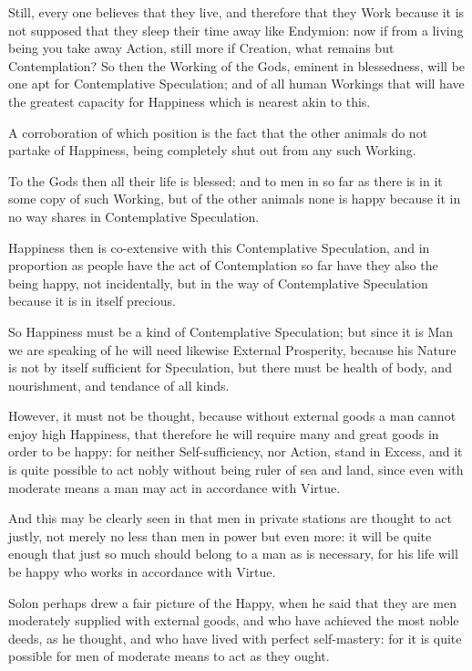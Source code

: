 Still, every one believes that they live, and therefore that they Work because
it is not supposed that they sleep their time away like Endymion: now if from a
living being you take away Action, still more if Creation, what remains but
Contemplation? So then the Working of the Gods, eminent in blessedness, will be
one apt for Contemplative Speculation; and of all human Workings that will have
the greatest capacity for Happiness which is nearest akin to this.

A corroboration of which position is the fact that the other animals do not
partake of Happiness, being completely shut out from any such Working.

To the Gods then all their life is blessed; and to men in so far as there is in
it some copy of such Working, but of the other animals none is happy because it
in no way shares in Contemplative Speculation.

Happiness then is co-extensive with this Contemplative Speculation, and in
proportion as people have the act of Contemplation so far have they also the
being happy, not incidentally, but in the way of Contemplative Speculation
because it is in itself precious.


So Happiness must be a kind of Contemplative Speculation; but since it is Man
we are speaking of he will need likewise External Prosperity, because his
Nature is not by itself sufficient for Speculation, but there must be health of
body, and nourishment, and tendance of all kinds.

However, it must not be thought, because without external goods a man cannot
enjoy high Happiness, that therefore he will require many and great goods in
order to be happy: for neither Self-sufficiency, nor Action, stand in Excess,
and it is quite possible to act nobly without being ruler of sea and land,
since even with moderate means a man may act in accordance with Virtue.

And this may be clearly seen in that men in private stations are thought to act
justly, not merely no less than men in power but even more: it will be quite
enough that just so much should belong to a man as is necessary, for his life
will be happy who works in accordance with Virtue.

Solon perhaps drew a fair picture of the Happy, when he said that they are men
moderately supplied with external goods, and who have achieved the most noble
deeds, as he thought, and who have lived with perfect self-mastery: for it is
quite possible for men of moderate means to act as they ought.

